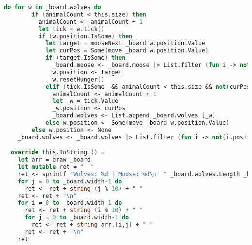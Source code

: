 \begin{lstlisting}[language=FSharp]
    do for w in _board.wolves do
        if (animalCount < this.size) then
          animalCount <- animalCount + 1
          let tick = w.tick()
          if (w.position.IsSome) then
            let target = mooseNext _board w.position.Value
            let curPos = Some(move _board w.position.Value)
            if (target.IsSome) then
              _board.moose <- _board.moose |> List.filter (fun i -> not(i.position = target))
              w.position <- target
              w.resetHunger()
            elif (tick.IsSome  && animalCount < this.size && not(curPos = w.position)) then
              animalCount <- animalCount + 1
              let _w = tick.Value
              _w.position <- curPos
              _board.wolves <- List.append _board.wolves [_w]
            else w.position <- Some(move _board w.position.Value)
        else w.position <- None
    _board.wolves <- _board.wolves |> List.filter (fun i -> not(i.position = None))

  override this.ToString () =
    let arr = draw _board
    let mutable ret = "  "
    ret <- sprintf "Wolves: %d | Moose: %d\n  " _board.wolves.Length _board.moose.Length
    for j = 0 to _board.width-1 do
      ret <- ret + string (j % 10) + " "
    ret <- ret + "\n"
    for i = 0 to _board.width-1 do
      ret <- ret + string (i % 10) + " "
      for j = 0 to _board.width-1 do
        ret <- ret + string arr.[i,j] + " "
      ret <- ret + "\n"
    ret
\end{lstlisting}

